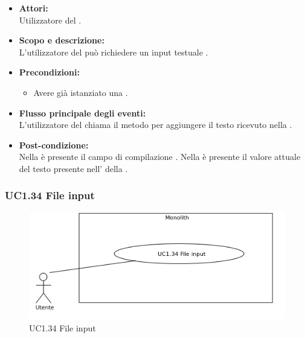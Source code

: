 \begin{itemize}
	\item \textbf{Attori:}
	\\Utilizzatore del .
	\item \textbf{Scopo e descrizione:} 
	\\L'utilizzatore del  può richiedere un input testuale .
	\item \textbf{Precondizioni:}
	\begin{itemize}
		\item Avere già istanziato una .
	\end{itemize}
	\item \textbf{Flusso principale degli eventi:}
	\\L'utilizzatore del  chiama il metodo per aggiungere il testo ricevuto nella .
	\item \textbf{Post-condizione:}
	\\Nella {} è presente il campo di compilazione . Nella  è presente il valore attuale del testo presente nell' della .
\end{itemize}

\subsubsection{UC1.34 File input} \label{UC1.34}

\begin{figure}[H]
	\centering
	\includegraphics[width=15cm]{../../documenti/AnalisiDeiRequisiti/Diagrammi_img/uc1_34.png}
	\caption{UC1.34 File input}
\end{figure}

